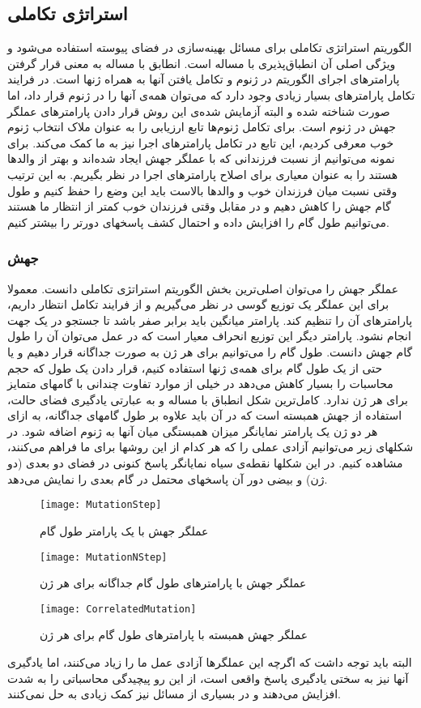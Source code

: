 \documentclass{report}
\begin{document}
\subsection{استراتژی تکاملی}
الگوریتم استراتژی تکاملی برای مسائل بهینه‌سازی در فضای پیوسته استفاده می‌شود و ویژگی اصلی آن انطباق‌پذیری با مساله است. انطابق با مساله به معنی قرار گرفتن پارامترهای اجرای الگوریتم در ژنوم و تکامل یافتن آنها به همراه ژنها است. در فرایند تکامل پارامترهای بسیار زیادی وجود دارد که می‌توان همه‌ی آنها را در ژنوم قرار داد، اما صورت شناخته شده و البته آزمایش شده‌ی  این روش قرار دادن پارامترهای عملگر جهش در ژنوم است. برای تکامل ژنوم‌ها تابع ارزیابی را به عنوان ملاک انتخاب ژنوم خوب معرفی کردیم، این تابع در تکامل پارامترهای اجرا نیز به ما کمک می‌کند. برای نمونه می‌توانیم از نسبت فرزندانی که با عملگر جهش ایجاد شده‌اند و بهتر از والدها هستند را به عنوان معیاری برای اصلاح پارامترهای اجرا در نظر بگیریم. به این ترتیب وقتی نسبت میان فرزندان خوب و والدها بالاست باید این وضع را حفظ کنیم و طول گام جهش را کاهش دهیم و در مقابل وقتی فرزندان خوب کمتر از انتظار ما هستند می‌توانیم طول گام را افزایش داده و احتمال کشف پاسخهای دورتر را بیشتر کنیم.

\subsubsection{جهش}
عملگر جهش را می‌توان اصلی‌ترین  بخش الگوریتم استراتژی تکاملی دانست. معمولا برای این عملگر یک توزیع گوسی در نظر می‌گیریم و از فرایند تکامل انتظار داریم، پارامترهای آن را تنظیم کند. پارامتر میانگین باید برابر صفر باشد تا جستجو در یک جهت انجام نشود. پارامتر دیگر این توزیع انحراف معیار است که در عمل می‌توان آن را طول گام جهش دانست. 
طول گام را می‌توانیم برای هر ژن به صورت جداگانه قرار دهیم و یا حتی از یک طول گام برای همه‌ی ژنها استفاده کنیم، قرار دادن یک طول که حجم محاسبات را بسیار کاهش می‌دهد در خیلی از موارد تفاوت چندانی با گامهای متمایز برای هر ژن ندارد. کامل‌ترین شکل انطباق با مساله و به عبارتی یادگیری فضای حالت، استفاده از جهش همبسته  است که در آن باید علاوه بر طول گامهای جداگانه، به ازای هر دو ژن یک پارامتر نمایانگر میزان همبستگی میان آنها به ژنوم اضافه شود.
در شکلهای زیر می‌توانیم آزادی عملی را که هر کدام از این روشها برای ما فراهم می‌کنند، مشاهده کنیم. در این شکلها نقطه‌ی سیاه نمایانگر پاسخ کنونی در فضای دو بعدی (دو ژن) و بیضی دور آن پاسخهای محتمل در گام بعدی را نمایش می‌دهد. 
\begin{figure}[h] \centerline{\texttt{[image: MutationStep]}} \caption{\label{fMutationStep}
 عملگر جهش با یک پارامتر طول گام
 } \end{figure}
\begin{figure}[h] \centerline{\texttt{[image: MutationNStep]}} \caption{\label{fMutationNStep}
 عملگر جهش با پارامترهای طول گام جداگانه برای هر ژن
 } \end{figure}
\begin{figure}[h] \centerline{\texttt{[image: CorrelatedMutation]}} \caption{\label{fCorrelatedMutation}
 عملگر جهش همبسته با پارامترهای طول گام برای هر ژن
 } \end{figure}
  البته باید توجه داشت که اگرچه این عملگرها آزادی عمل ما را زیاد می‌کنند، اما یادگیری آنها نیز به سختی یادگیری پاسخ واقعی است، از این رو پیچیدگی محاسباتی را به شدت افزایش می‌دهند و در بسیاری از مسائل نیز کمک زیادی به حل نمی‌کنند.
\end{document}
